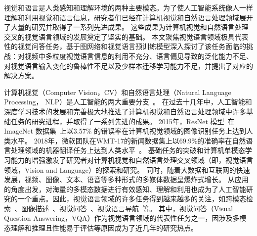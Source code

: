 

视觉和语言是人类感知和理解环境的两种主要模态。为了使人工智能系统像人一样理解和利用视觉和语言信息，研究者们已经在计算机视觉和自然语言处理领域展开了大量的研究并取得了一系列先进成果。
这些成果为计算机视觉和自然语言处理交叉的视觉语言领域的发展奠定了坚实的基础。
本文聚焦视觉语言领域极具代表性的视觉问答任务，基于图网络和视觉语言预训练模型深入探讨了该任务面临的挑战：对视频中多粒度视觉语言信息的利用不充分、语言偏见导致的泛化能力不足、对视觉语言输入变化的鲁棒性不足以及少样本迁移学习能力不足，并提出了对应的解决方案。




计算机视觉（Computer Vision，CV）和自然语言处理（Natural Language Processing， NLP）是人工智能的两大重要分支~\cite{li2022vision}。
在过去十几年中，人工智能和深度学习技术的发展和完善极大地推进了计算机视觉和自然语言处理领域中许多基础任务的研究进程，并取得了一系列先进的成果。
2015年，ResNet 模型~\cite{he2016deep}在ImageNet 数据集~\cite{deng2009imagenet}上以3.57\% 的错误率在计算机视觉领域的图像识别任务上达到人类水平。
2018年，微软团队在WMT-17的新闻数据集上以69.9\%的准确率在自然语言处理领域的机器翻译任务上达到人类水平~\cite{hassan2018achieving}。
基础任务的突破和计算机单模态学习能力的增强激发了研究者对计算机视觉和自然语言处理交叉领域（即，视觉语言领域，Vision and Language）的探索和研究。
同时，随着大数据和互联网的快速发展，视频、图像、文本、语音等多种形式的多媒体数据呈爆炸式增长。
从应用的角度出发，对海量的多模态数据进行有效感知、理解和利用也成为了人工智能研究的一个重点。因此，视觉语言领域的许多任务得到越来越多的关注，如跨模态检索~\cite{frome2013devise}、图像描述~\cite{vinyals2016show}、视觉问答~\cite{antol2015vqa}、视觉语言导航~\cite{anderson2018vision}等。
其中，视觉问答（Visual Question Answering，VQA）作为视觉语言领域的代表性任务之一，因涉及多模态理解和推理且性能易于评估等原因成为了近几年的研究热点。


